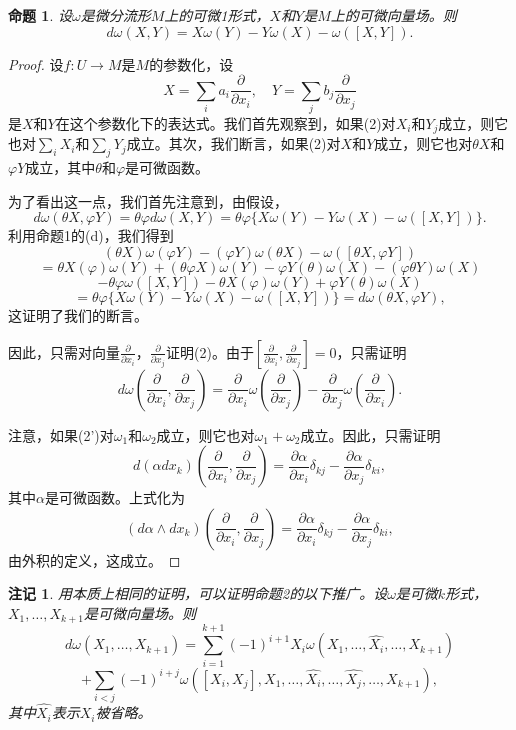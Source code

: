 \documentclass[12pt,a4paper]{ctexbook}
\newtheorem{proposition}[theorem]{命题}
\newtheorem{remark}[theorem]{注记}
\begin{document}
\begin{proposition}
设$\omega$是微分流形$M$上的可微1形式，$X$和$Y$是$M$上的可微向量场。则
$$d\omega(X,Y) = X\omega(Y) - Y\omega(X) - \omega([X,Y]). \tag{2}$$
\end{proposition}

\begin{proof}
设$f:U\to M$是$M$的参数化，设
$$X = \sum_i a_i \frac{\partial}{\partial x_i},\quad Y = \sum_j b_j \frac{\partial}{\partial x_j}$$
是$X$和$Y$在这个参数化下的表达式。我们首先观察到，如果(2)对$X_i$和$Y_j$成立，则它也对$\sum_i X_i$和$\sum_j Y_j$成立。其次，我们断言，如果(2)对$X$和$Y$成立，则它也对$\theta X$和$\varphi Y$成立，其中$\theta$和$\varphi$是可微函数。

为了看出这一点，我们首先注意到，由假设，
$$d\omega(\theta X,\varphi Y) = \theta\varphi d\omega(X,Y) = \theta\varphi\{X\omega(Y) - Y\omega(X) - \omega([X,Y])\}.$$
利用命题1的(d)，我们得到
$$(\theta X)\omega(\varphi Y) - (\varphi Y)\omega(\theta X) - \omega([\theta X,\varphi Y])$$
$$= \theta X(\varphi)\omega(Y) + (\theta\varphi X)\omega(Y) - \varphi Y(\theta)\omega(X) - (\varphi\theta Y)\omega(X)$$
$$- \theta\varphi\omega([X,Y]) - \theta X(\varphi)\omega(Y) + \varphi Y(\theta)\omega(X)$$
$$= \theta\varphi\{X\omega(Y) - Y\omega(X) - \omega([X,Y])\} = d\omega(\theta X,\varphi Y),$$
这证明了我们的断言。

因此，只需对向量$\frac{\partial}{\partial x_i}$，$\frac{\partial}{\partial x_j}$证明(2)。由于$\left[\frac{\partial}{\partial x_i},\frac{\partial}{\partial x_j}\right]=0$，只需证明
$$d\omega\left(\frac{\partial}{\partial x_i},\frac{\partial}{\partial x_j}\right) = \frac{\partial}{\partial x_i}\omega\left(\frac{\partial}{\partial x_j}\right) - \frac{\partial}{\partial x_j}\omega\left(\frac{\partial}{\partial x_i}\right). \tag{2'}$$

注意，如果(2')对$\omega_1$和$\omega_2$成立，则它也对$\omega_1+\omega_2$成立。因此，只需证明
$$d(\alpha dx_k)\left(\frac{\partial}{\partial x_i},\frac{\partial}{\partial x_j}\right) = \frac{\partial\alpha}{\partial x_i}\delta_{kj} - \frac{\partial\alpha}{\partial x_j}\delta_{ki},$$
其中$\alpha$是可微函数。上式化为
$$(d\alpha\wedge dx_k)\left(\frac{\partial}{\partial x_i},\frac{\partial}{\partial x_j}\right) = \frac{\partial\alpha}{\partial x_i}\delta_{kj} - \frac{\partial\alpha}{\partial x_j}\delta_{ki},$$
由外积的定义，这成立。
\end{proof}

\begin{remark}
用本质上相同的证明，可以证明命题2的以下推广。设$\omega$是可微$k$形式，$X_1,\ldots,X_{k+1}$是可微向量场。则
$$d\omega(X_1,\ldots,X_{k+1}) = \sum_{i=1}^{k+1} (-1)^{i+1} X_i\omega(X_1,\ldots,\hat{X_i},\ldots,X_{k+1})$$
$$+ \sum_{i<j} (-1)^{i+j}\omega([X_i,X_j],X_1,\ldots,\hat{X_i},\ldots,\hat{X_j},\ldots,X_{k+1}),$$
其中$\hat{X_i}$表示$X_i$被省略。
\end{remark}
\end{document}
